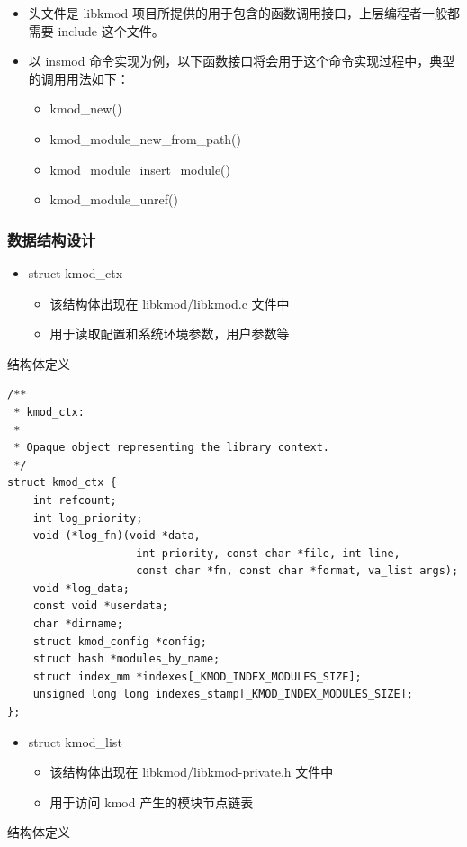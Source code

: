 \documentclass[11pt,a4paper]{article}
\begin{document}
\begin{itemize}
\item
  头文件是 libkmod
  项目所提供的用于包含的函数调用接口，上层编程者一般都需要 include
  这个文件。
\item
  以 insmod
  命令实现为例，以下函数接口将会用于这个命令实现过程中，典型的调用用法如下：
  \begin{itemize}
  \item
    kmod\_new()
  \item
    kmod\_module\_new\_from\_path()
  \item
    kmod\_module\_insert\_module()
  \item
    kmod\_module\_unref()
  \end{itemize}
\end{itemize}
\subsubsection{数据结构设计}

\begin{itemize}
\item
  struct kmod\_ctx
  \begin{itemize}
  \item
    该结构体出现在 libkmod/libkmod.c 文件中
  \item
    用于读取配置和系统环境参数，用户参数等
  \end{itemize}
\end{itemize}
结构体定义

{\begin{shaded}\begin{verbatim}
/**
 * kmod_ctx:
 *
 * Opaque object representing the library context.
 */
struct kmod_ctx {
    int refcount;
    int log_priority;
    void (*log_fn)(void *data,
                    int priority, const char *file, int line,
                    const char *fn, const char *format, va_list args);
    void *log_data;
    const void *userdata;
    char *dirname;
    struct kmod_config *config;
    struct hash *modules_by_name;
    struct index_mm *indexes[_KMOD_INDEX_MODULES_SIZE];
    unsigned long long indexes_stamp[_KMOD_INDEX_MODULES_SIZE];
};
\end{verbatim}\end{shaded}}
\begin{itemize}
\item
  struct kmod\_list
  \begin{itemize}
  \item
    该结构体出现在 libkmod/libkmod-private.h 文件中
  \item
    用于访问 kmod 产生的模块节点链表
  \end{itemize}
\end{itemize}
结构体定义
\end{document}
